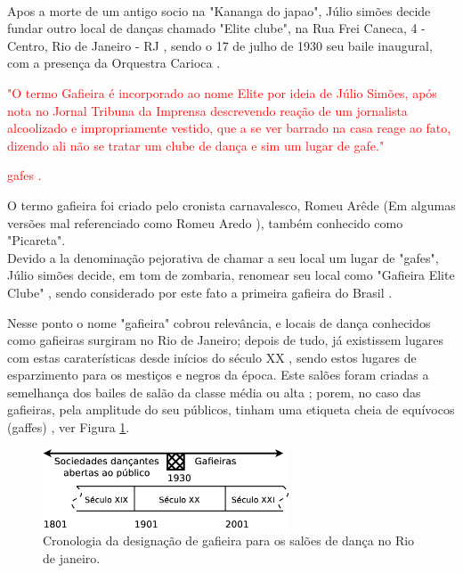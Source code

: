 ~\\
Apos a morte de um antigo socio na "Kananga do japao", 
Júlio simões decide fundar  outro local de danças chamado "Elite clube",
na Rua Frei Caneca, 4 - Centro, Rio de Janeiro - RJ \cite{cabral2016elisete},
sendo o 17 de julho de 1930 seu baile inaugural, com a presença da Orquestra Carioca \cite{ProjetoleiElite,ProjetoleiElite17} \cite[pp. 84]{cabral1996escolas} \cite[pp. 188]{raca1999}.


\textcolor{red}{"O termo Gafieira é incorporado ao nome Elite por ideia de Júlio Simões, após nota no Jornal Tribuna da Imprensa descrevendo reação de um jornalista alcoolizado e impropriamente vestido, que a se ver barrado na casa reage ao fato, dizendo ali não se tratar um clube de dança e sim um lugar de gafe." \cite{ProjetoleiElite} }

\textcolor{red}{gafes \cite[pp. 188]{raca1999}.}


O termo gafieira foi criado pelo cronista carnavalesco, Romeu Arêde \cite[pp. 21]{efege1974maxixe} \cite[pp. 78]{coutinho2006cronistas}
(Em algumas versões mal referenciado como Romeu Aredo \cite[pp. 188]{raca1999}), 
também conhecido como "Picareta".
~\\


Devido a la denominação pejorativa de chamar a seu local um lugar de "gafes",
Júlio simões decide, em tom de zombaria, renomear seu local como "Gafieira Elite Clube" \cite[pp. 79]{moura1995tia},
sendo considerado por este fato a primeira gafieira do Brasil \cite{cabral2016elisete}.


Nesse ponto o nome "gafieira" cobrou relevância, e locais de dança conhecidos como gafieiras surgiram no Rio de Janeiro;
depois de tudo, já existissem lugares com estas caraterísticas desde inícios do século XX \cite[pp. 49]{diniz2003almanaque}, 
sendo estos lugares de esparzimento para os mestiços e negros da época.
Este salões foram criadas a semelhança dos bailes de salão da classe média ou alta \cite[pp. 78]{coutinho2006cronistas}; porem, no
caso das gafieiras, pela amplitude do seu públicos, tinham uma etiqueta cheia de equívocos (gaffes) \cite[pp. 49]{diniz2003almanaque},
ver Figura \ref{fig:gafieiracrono}.
\begin{figure}[h]
  \centering
    \includegraphics[width=0.65\textwidth]{chapters/cap-intro/gafieira-crono.eps}
  \caption{Cronologia da designação de gafieira para os salões de dança no Rio de janeiro.}
  \label{fig:gafieiracrono}
\end{figure}





